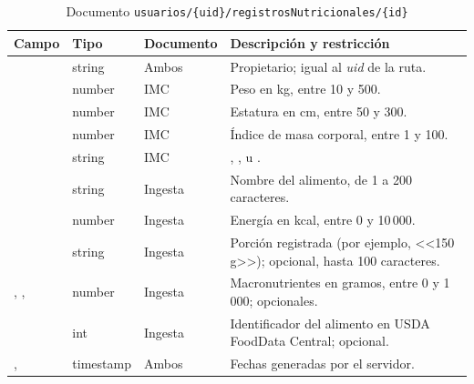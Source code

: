 \begin{table}[H]
\centering
\small
\begin{tabularx}{\textwidth}{|L{3.0cm}|L{1.7cm}|L{1.9cm}|Y|}
\hline
{} \textbf{Campo} & \textbf{Tipo} & \textbf{Documento} & \textbf{Descripción y restricción} \\
\hline
{} & string & Ambos & Propietario; igual al \emph{uid} de la ruta. \\ \hline
{} & number & IMC & Peso en kg, entre 10 y 500. \\ \hline
{} & number & IMC & Estatura en cm, entre 50 y 300. \\ \hline
{} & number & IMC & Índice de masa corporal, entre 1 y 100. \\ \hline
{} & string & IMC & , ,  u . \\ \hline
{} & string & Ingesta & Nombre del alimento, de 1 a 200 caracteres. \\ \hline
{} & number & Ingesta & Energía en kcal, entre 0 y 10\,000. \\ \hline
{} & string & Ingesta & Porción registrada (por ejemplo, <<150 g>>); opcional, hasta 100 caracteres. \\ \hline
{}, ,  & number & Ingesta & Macronutrientes en gramos, entre 0 y 1\,000; opcionales. \\ \hline
{} & int & Ingesta & Identificador del alimento en USDA FoodData Central; opcional. \\ \hline
{},  & timestamp & Ambos & Fechas generadas por el servidor. \\
\hline
\end{tabularx}
\caption{Documento \texttt{usuarios/\{uid\}/registrosNutricionales/\{id\}}}
\label{tab:dd-nutricion}
\end{table}

